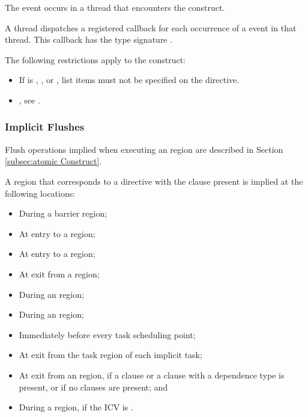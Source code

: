 \events

The  event occurs in a thread that encounters the  construct.

\tools

A thread dispatches a registered  callback
for each occurrence of a  event in that thread. This
callback has the type signature .

\restrictions
The following restrictions apply to the  construct:

\begin{itemize}
\item If  is , , or
      , list items must not be specified on the  directive.
\end{itemize}

\crossreferences
\begin{itemize}
\item {}, see
.
\end{itemize}

\subsubsection{Implicit Flushes}
\label{subsec:implicit flushes}

Flush operations implied when executing an  region are described in
Section \ref{subsec:atomic Construct}.

A  region that corresponds to a  directive with the
 clause present is implied at the following locations:

\begin{itemize}
\item During a barrier region;
\item At entry to a  region;
\item At entry to a  region;
\item At exit from a  region;
\item During an  region;
\item During an  region;
\item Immediately before every task scheduling point;
\item At exit from the task region of each implicit task;
\item At exit from an  region, if a  clause or 
      a  clause with a  dependence type is present, 
      or if no clauses are present; and
\item During a  region, if the  ICV is .
\end{itemize}

